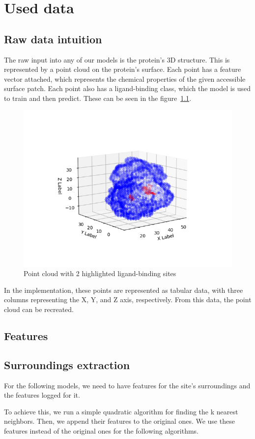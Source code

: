 \chapter{Used data}

\section{Raw data intuition}

The raw input into any of our models is the protein's 3D structure. This is represented by a point cloud on the protein's surface. Each point has a feature vector attached, which represents the chemical properties of the given accessible surface patch. Each point also has a ligand-binding class, which the model is used to train and then predict. These can be seen in the figure~\ref{fig:data_point_cloud}.

\begin{figure}
    \centering
    \includegraphics[width=1\linewidth]{img/protein.png}
    \caption{Point cloud with 2 highlighted ligand-binding sites}
    \label{fig:data_point_cloud}
\end{figure}

In the implementation, these points are represented as tabular data, with three columns representing the X, Y, and Z axis, respectively. From this data, the point cloud can be recreated.

\section{Features}

\section{Surroundings extraction}

For the following models, we need to have features for the site's surroundings and the features logged for it.

To achieve this, we run a simple quadratic algorithm for finding the k nearest neighbors. Then, we append their features to the original ones. We use these features instead of the original ones for the following algorithms.

